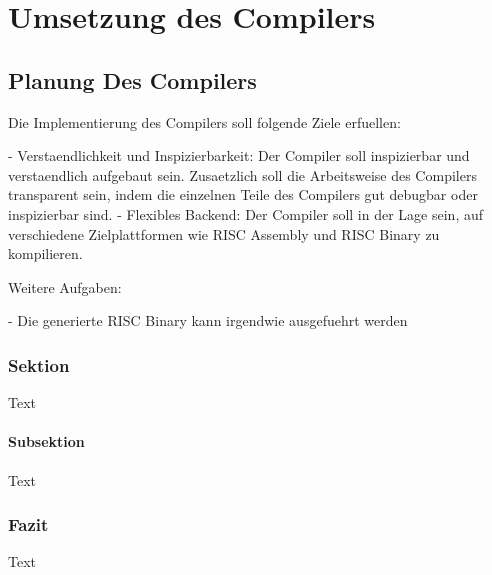 \part{Umsetzung des Compilers}
\chapter{Planung Des Compilers}


Die Implementierung des Compilers soll folgende Ziele erfuellen:

- Verstaendlichkeit und Inspizierbarkeit: Der Compiler soll inspizierbar und verstaendlich aufgebaut sein. Zusaetzlich soll die Arbeitsweise des Compilers transparent sein, indem die einzelnen Teile des Compilers gut debugbar oder inspizierbar sind.
- Flexibles Backend: Der Compiler soll in der Lage sein, auf verschiedene Zielplattformen wie RISC Assembly und RISC Binary zu kompilieren.

Weitere Aufgaben:

- Die generierte RISC Binary kann irgendwie ausgefuehrt werden


\section{Sektion}

Text



\subsection{Subsektion}

Text



\section{Fazit}

Text
